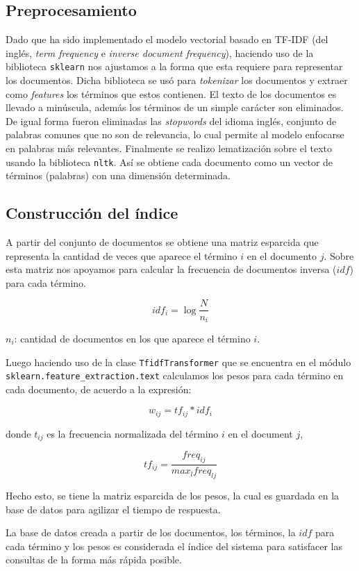 \documentclass[12pt]{llncs}
\begin{document}
\subsection{Preprocesamiento}

Dado que ha sido implementado el modelo vectorial basado en TF-IDF (del inglés, \textit{term frequency} e \textit{inverse document frequency}), haciendo uso de la biblioteca \verb+sklearn+ nos ajustamos a la forma que esta requiere para representar los documentos. Dicha biblioteca se usó para \textit{tokenizar} los documentos y extraer como \textit{features} los términos que estos contienen. El texto de los documentos es llevado a minúscula, además los términos de un simple carácter son eliminados. De igual forma fueron eliminadas las \textit{stopwords} del idioma inglés, conjunto de palabras comunes que no son de relevancia, lo cual permite al modelo enfocarse en palabras más relevantes. Finalmente se realizo lematización sobre el texto usando la biblioteca \verb+nltk+. Así se obtiene cada documento como un vector de términos (palabras) con una dimensión determinada.

\subsection{Construcción del índice}

A partir del conjunto de documentos se obtiene una matriz esparcida que representa la cantidad de veces que aparece el término $i$ en el documento $j$. Sobre esta matriz nos apoyamos para calcular la frecuencia de documentos inversa ($idf$) para cada término.

$$idf_i = \log \frac{N}{n_i}$$

$n_i$: cantidad de documentos en los que aparece el término $i$.

Luego haciendo uso de la clase \verb+TfidfTransformer+ que se encuentra en el módulo \verb+sklearn.feature_extraction.text+ calculamos los pesos para cada término en cada documento, de acuerdo a la expresión:

$$w_{ij} = tf_{ij} * idf_i$$

donde $t_{ij}$ es la frecuencia normalizada del término $i$ en el document $j$,

$$tf_{ij} = \frac{freq_{ij}}{max_l freq_{lj}}$$

Hecho esto, se tiene la matriz esparcida de los pesos, la cual es guardada en la base de datos para agilizar el tiempo de respuesta.

La base de datos creada a partir de los documentos, los términos, la $idf$ para cada término y los pesos es considerada el índice del sistema para satisfacer las consultas de la forma más rápida posible.
\end{document}
